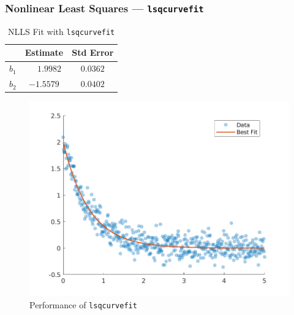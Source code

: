 \documentclass[11pt,xcolor={svgnames},aspectratio=169,usepdftitle=false]{beamer}
\begin{document}
\begin{frame}
\frametitle{Nonlinear Least Squares --- \texttt{lsqcurvefit}}
\begin{minipage}{0.45\textwidth}
    \begin{table}[htbp]
    \caption{NLLS Fit with \texttt{lsqcurvefit}}
    \begin{tabular}{@{}lcc@{}}
    \toprule
    & Estimate & Std Error \\
    \midrule
    $b_1$                   & $\phantom{-}1.9982$   & $0.0362$  \\
    $b_2$                   & $-1.5579$  & $0.0402$   \\
    \bottomrule
    \end{tabular}
    \end{table}
\end{minipage}
\begin{minipage}[r]{0.45\textwidth}
\begin{figure}
  \centering
  \includegraphics[width = \textwidth]{../figures/lsqcurvefit_performance.png}
  \caption{Performance of \texttt{lsqcurvefit}}
  \label{fig:lsqcurvefit_performance}
\end{figure}
\end{minipage}
\end{frame}
\end{document}
